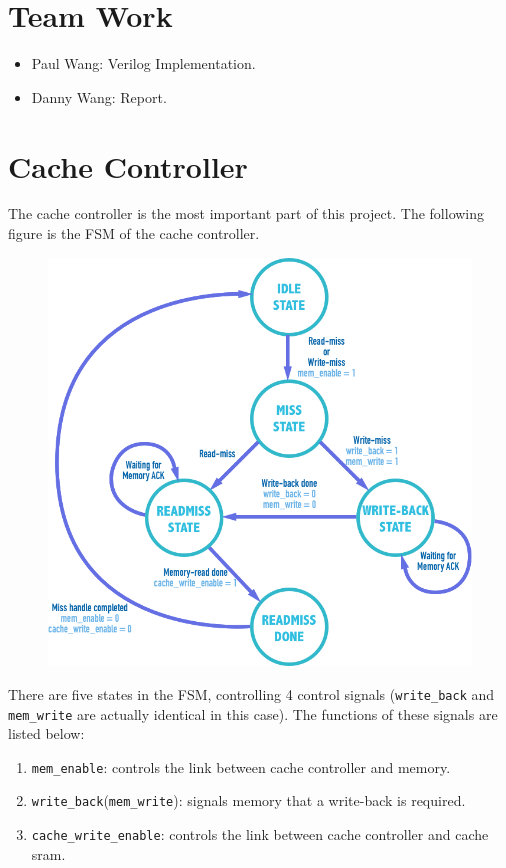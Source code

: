 \section{Team Work}

\begin{itemize}
  \item Paul Wang: Verilog Implementation.
  \item Danny Wang: Report.
\end{itemize}

\section{Cache Controller}

The cache controller is the most important part of this project. The following figure is the FSM of the cache controller.

\begin{figure}[h!]
  \centering
  \includegraphics[width=.8\textwidth]{state.png}
\end{figure}

There are five states in the FSM, controlling 4 control signals (\texttt{write\_back} and \texttt{mem\_write} are actually identical in this case). The functions of these signals are listed below:

\begin{enumerate}
  \item \texttt{mem\_enable}: controls the link between cache controller and memory.
  \item \texttt{write\_back}(\texttt{mem\_write}): signals memory that a write-back is required.
  \item \texttt{cache\_write\_enable}: controls the link between cache controller and cache sram.
\end{enumerate}

